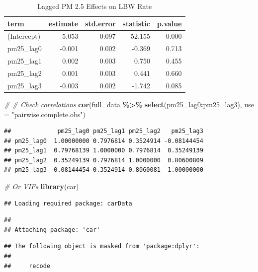 \documentclass[
]{article}
\newenvironment{Shaded}{\begin{snugshade}}{\end{snugshade}}
\newcommand{\AttributeTok}[1]{\textcolor[rgb]{0.13,0.29,0.53}{#1}}
\newcommand{\CommentTok}[1]{\textcolor[rgb]{0.56,0.35,0.01}{\textit{#1}}}
\newcommand{\FunctionTok}[1]{\textcolor[rgb]{0.13,0.29,0.53}{\textbf{#1}}}
\newcommand{\NormalTok}[1]{#1}
\newcommand{\SpecialCharTok}[1]{\textcolor[rgb]{0.81,0.36,0.00}{\textbf{#1}}}
\newcommand{\StringTok}[1]{\textcolor[rgb]{0.31,0.60,0.02}{#1}}
\begin{document}
\begin{longtable}[t]{lrrrr}
\caption{\label{tab:unnamed-chunk-4}Lagged PM 2.5 Effects on LBW Rate}\\
\toprule
term & estimate & std.error & statistic & p.value\\
\midrule
(Intercept) & 5.053 & 0.097 & 52.155 & 0.000\\
pm25\_lag0 & -0.001 & 0.002 & -0.369 & 0.713\\
pm25\_lag1 & 0.002 & 0.003 & 0.750 & 0.455\\
pm25\_lag2 & 0.001 & 0.003 & 0.441 & 0.660\\
pm25\_lag3 & -0.003 & 0.002 & -1.742 & 0.085\\
\bottomrule
\end{longtable}

\begin{Shaded}
\begin{Highlighting}[]
\CommentTok{\# \# Check correlations}
\FunctionTok{cor}\NormalTok{(full\_data }\SpecialCharTok{\%\textgreater{}\%} \FunctionTok{select}\NormalTok{(pm25\_lag0}\SpecialCharTok{:}\NormalTok{pm25\_lag3), }\AttributeTok{use =} \StringTok{"pairwise.complete.obs"}\NormalTok{)}
\end{Highlighting}
\end{Shaded}

\begin{verbatim}
##             pm25_lag0 pm25_lag1 pm25_lag2   pm25_lag3
## pm25_lag0  1.00000000 0.7976814 0.3524914 -0.08144454
## pm25_lag1  0.79768139 1.0000000 0.7976814  0.35249139
## pm25_lag2  0.35249139 0.7976814 1.0000000  0.80600809
## pm25_lag3 -0.08144454 0.3524914 0.8060081  1.00000000
\end{verbatim}

\begin{Shaded}
\begin{Highlighting}[]
\CommentTok{\# Or VIFs}
\FunctionTok{library}\NormalTok{(car)}
\end{Highlighting}
\end{Shaded}

\begin{verbatim}
## Loading required package: carData
\end{verbatim}

\begin{verbatim}
## 
## Attaching package: 'car'
\end{verbatim}

\begin{verbatim}
## The following object is masked from 'package:dplyr':
## 
##     recode
\end{verbatim}
\end{document}
